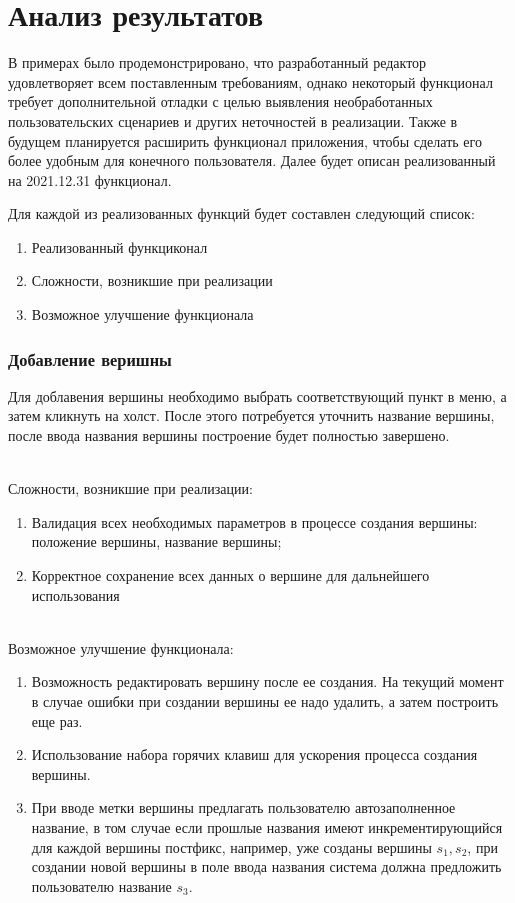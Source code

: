 \chapter{Анализ результатов}\label{chap6_results_analysis}

В примерах было продемонстрировано, что разработанный редактор удовлетворяет всем поставленным требованиям, однако некоторый функционал требует дополнительной отладки с целью выявления необработанных пользовательских сценариев и других неточностей в реализации. Также в будущем планируется расширить функционал приложения, чтобы сделать его более удобным для конечного пользователя. Далее будет описан реализованный на 2021.12.31 функционал.

Для каждой из реализованных функций будет составлен следующий список:
\begin{enumerate}
	\item Реализованный функциконал
	\item Сложности, возникшие при реализации
	\item Возможное улучшение функционала
\end{enumerate}

\subsection{Добавление веришны}
Для доблавения вершины необходимо выбрать соответствующий пункт в меню, а затем кликнуть на холст.
После этого потребуется уточнить название вершины, после ввода названия вершины построение будет полностью завершено.

~\\Сложности, возникшие при реализации:
\begin{enumerate}
	\item Валидация всех необходимых параметров в процессе создания вершины: положение вершины, название вершины;
	\item Корректное сохранение всех данных о вершине для дальнейшего использования
\end{enumerate}

~\\Возможное улучшение функционала:
\begin{enumerate}
	\item Возможность редактировать вершину после ее создания. На текущий момент в случае ошибки при создании вершины ее надо удалить, а затем построить еще раз.
	\item Использование набора горячих клавиш для ускорения процесса создания вершины.
	\item При вводе метки вершины предлагать пользователю автозаполненное название, в том случае если прошлые названия имеют инкрементирующийся для каждой вершины постфикс, например, уже созданы вершины $s_1, s_2$, при создании новой вершины в поле ввода названия система должна предложить пользователю название $s_3$.
\end{enumerate}

